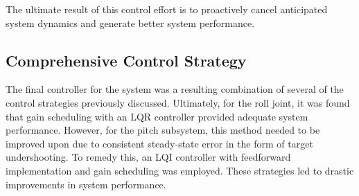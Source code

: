 The ultimate result of this control effort is to proactively cancel anticipated system dynamics and generate better system performance.

\subsection{Comprehensive Control Strategy}


The final controller for the system was a resulting combination of several of the control strategies previously discussed. Ultimately, for the roll joint, it was found that gain scheduling with an LQR controller provided adequate system performance. However, for the pitch subsystem, this method needed to be improved upon due to consistent steady-state error in the form of target undershooting. To remedy this, an LQI controller with feedforward implementation and gain scheduling was employed. These strategies led to drastic improvements in system performance.